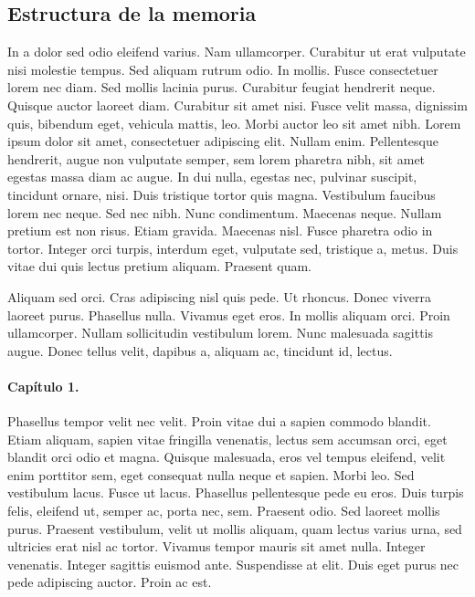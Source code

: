 %
%
\subsection*{Estructura de la memoria}


In a dolor sed odio eleifend varius. Nam ullamcorper. Curabitur ut erat vulputate nisi molestie tempus. Sed aliquam rutrum odio. In mollis. Fusce consectetuer lorem nec diam. Sed mollis lacinia purus. Curabitur feugiat hendrerit neque. Quisque auctor laoreet diam. Curabitur sit amet nisi. Fusce velit massa, dignissim quis, bibendum eget, vehicula mattis, leo. Morbi auctor leo sit amet nibh. Lorem ipsum dolor sit amet, consectetuer adipiscing elit. Nullam enim. Pellentesque hendrerit, augue non vulputate semper, sem lorem pharetra nibh, sit amet egestas massa diam ac augue. In dui nulla, egestas nec, pulvinar suscipit, tincidunt ornare, nisi. Duis tristique tortor quis magna. Vestibulum faucibus lorem nec neque. Sed nec nibh. Nunc condimentum. Maecenas neque. Nullam pretium est non risus. Etiam gravida. Maecenas nisl. Fusce pharetra odio in tortor. Integer orci turpis, interdum eget, vulputate sed, tristique a, metus. Duis vitae dui quis lectus pretium aliquam. Praesent quam.

Aliquam sed orci. Cras adipiscing nisl quis pede. Ut rhoncus. Donec viverra laoreet purus. Phasellus nulla. Vivamus eget eros. In mollis aliquam orci. Proin ullamcorper. Nullam sollicitudin vestibulum lorem. Nunc malesuada sagittis augue. Donec tellus velit, dapibus a, aliquam ac, tincidunt id, lectus. 


\paragraph*{Capítulo 1.}
Phasellus tempor velit nec velit. Proin vitae dui a sapien commodo blandit. Etiam aliquam, sapien vitae fringilla venenatis, lectus sem accumsan orci, eget blandit orci odio et magna. Quisque malesuada, eros vel tempus eleifend, velit enim porttitor sem, eget consequat nulla neque et sapien. Morbi leo. Sed vestibulum lacus. Fusce ut lacus. Phasellus pellentesque pede eu eros. Duis turpis felis, eleifend ut, semper ac, porta nec, sem. Praesent odio. Sed laoreet mollis purus. Praesent vestibulum, velit ut mollis aliquam, quam lectus varius urna, sed ultricies erat nisl ac tortor. Vivamus tempor mauris sit amet nulla. Integer venenatis. Integer sagittis euismod ante. Suspendisse at elit. Duis eget purus nec pede adipiscing auctor. Proin ac est.

